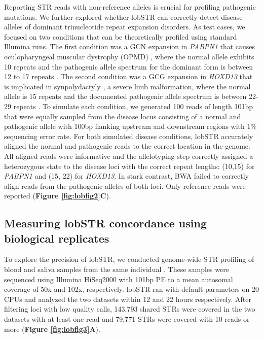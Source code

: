 Reporting STR reads with non-reference alleles is crucial for profiling pathogenic mutations. We further explored whether lobSTR can correctly detect disease alleles of dominant trinucleotide repeat expansion disorders. As test cases, we focused on two conditions that can be theoretically profiled using standard Illumina runs. The first condition was a GCN expansion in \emph{PABPN1} that causes oculopharyngeal muscular dystrophy (OPMD) \cite{BraisBouchardXieEtAl1998}, where the normal allele exhibits 10 repeats and the pathogenic allele spectrum for the dominant form is between 12 to 17 repeats \cite{PearsonNicholEdamuraCleary2005}. The second condition was a GCG expansion in \emph{HOXD13} that is implicated in synpolydactyly \cite{MuragakiMundlosUptonEtAl1996}, a severe limb malformation, where the normal allele is 15 repeats and the documented pathogenic allele spectrum is between 22-29 repeats \cite{PearsonNicholEdamuraCleary2005}. To simulate each condition, we generated 100 reads of length 101bp that were equally sampled from the disease locus consisting of a normal and pathogenic allele with 100bp flanking upstream and downstream regions with 1\% sequencing error rate. For both simulated disease conditions, lobSTR accurately aligned the normal and pathogenic reads to the correct location in the genome. All aligned reads were informative and the allelotyping step correctly assigned a heterozygous state to the disease loci with the correct repeat lengths: (10,15) for \emph{PABPN1} and (15, 22) for \emph{HOXD13}. In stark contrast, BWA failed to correctly align reads from the pathogenic alleles of both loci. Only reference reads were reported (\textbf{Figure \ref{fig:lobfig2}C}).

\subsection{Measuring lobSTR concordance using biological replicates}
To explore the precision of lobSTR, we conducted genome-wide STR profiling of blood and saliva samples from the same individual \cite{LamClarkChenEtAl2012}. These samples were sequenced using Illumina HiSeq2000 with 101bp PE to a mean autosomal coverage of 50x and 102x, respectively. lobSTR ran with default parameters on 20 CPUs and analyzed the two datasets within 12 and 22 hours respectively. After filtering loci with low quality calls, 143,793 shared STRs were covered in the two datasets with at least one read and 79,771 STRs were covered with 10 reads or more (\textbf{Figure \ref{fig:lobfig3}A}). 

